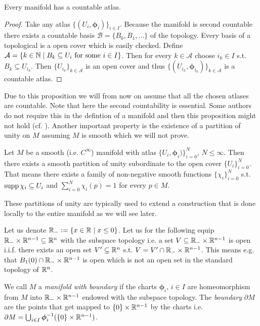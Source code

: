 \documentclass[../master_thesis.tex]{subfiles}
\begin{document}
\begin{proposition}
    Every manifold has a countable atlas. 
\end{proposition}
\begin{proof}
    Take any atlas $\{(U_i, \boldsymbol{\phi}_i) \}_{i \in I}$. Because the manifold is 
    second countable there exists a countable basis
    $\mathcal{B} = \{ B_0, B_1, ... \}$ of the topology. Every basis of a topological is 
    a open cover which is easily checked. Define 
    $\mathcal{A} = \{ k \in \mathbb{N} \mid B_k \subseteq U_i \text{ for some 
    $i \in I$} \}$. Then for every $k \in \mathcal{A}$ choose 
    $i_k \in I$ s.t. $B_k \subseteq U_{i_k}$. Then $\{U_{i_k}\}_{k\in \mathcal{A}}$ 
    is an open cover and thus $\{ (U_{i_k}, \boldsymbol{\phi}_{i_k}) \}_{k \in \mathcal{A}}$
    is a countable atlas.
\end{proof}
Due to this proposition we will from now on assume that all the chosen atlases
are countable.
Note that here the second countability is essential. Some authors do not 
require this in the defintion of a manifold and then this proposition might not hold 
(cf. \cite[1.A.2]{gallot_hulin_lafontaine}).
Another important property is the existence of a partition of unity on $M$ 
assuming $M$ is smooth which we will not prove.

\begin{theorem}
    Let $M$ be a smooth (i.e. $C^\infty$) manifold with atlas 
    $\{U_i, \boldsymbol{\phi}_i)\}_{i=0}^N$, $N \leq \infty$. Then there exists a smooth
    partition of unity subordinate to the open cover $\{U_i\}_{i=0}^N$.
    That means there exists a family of non-negative smooth functions $\{ \chi_i \}_{i=0}^N$
    s.t. $\operatorname{supp} \chi_i \subseteq U_i$ and $\sum_{i=0}^N \chi_i(p) = 1$ 
    for every $p \in M$.
\end{theorem}
These partitions of unity are typically used to extend a construction that 
is done locally to the entire manifold as we will see later.

Let us denote $\mathbb{R}_- \vcentcolon= \{ x \in \mathbb{R} \mid x \leq 0 \}$. 
Let us for the following equip $\mathbb{R}_- \times \mathbb{R}^{n-1} \subseteq \mathbb{R}^n$ with the 
subspace topology i.e. a set $V \subseteq \mathbb{R}_- \times \mathbb{R}^{n-1}$ is
open i.i.f. there exists an open set $V' \subseteq \mathbb{R}^n$ s.t. 
$V = V' \cap \mathbb{R}_- \times \mathbb{R}^{n-1}$. This means e.g. that 
$B_1(0) \cap \mathbb{R}_- \times \mathbb{R}^{n-1}$ is open which is not an open set 
in the standard topology of $\mathbb{R}^n$.
\begin{definition}\label{def:manifold_with_boundary}
    We call $M$ a \textit{manifold with boundary} if the charts $\boldsymbol{\phi}_i$, 
    $i\in I$ are homeomorphism from $M$ into $\mathbb{R}_- \times \mathbb{R}^{n-1}$ 
    endowed with the subspace topology. The \textit{boundary} 
    $\partial M$ are the points that get mapped to $\{0\} \times \mathbb{R}^{n-1}$ 
    by the charts i.e. $\partial M = \bigcup_{i\in I} \boldsymbol{\phi}_i^{-1}(\{0\} \times \mathbb{R}^{n-1})$.
\end{definition}
\end{document}
